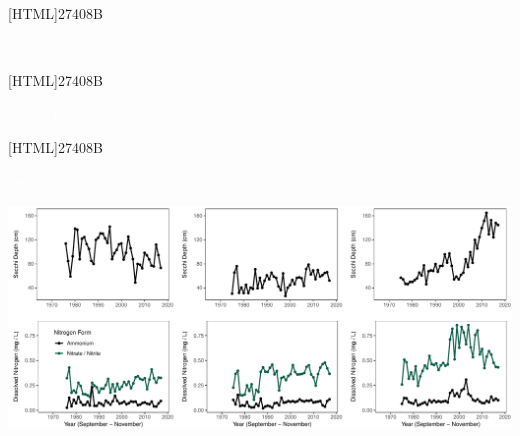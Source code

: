 \documentclass[]{article}\usepackage[]{graphicx}\usepackage[]{color}
\makeatletter
\def\maxwidth{ %
  \ifdim\Gin@nat@width>\linewidth
    \linewidth
  \else
    \Gin@nat@width
  \fi
}
\makeatother
\begin{document}
\vspace{-0cm}

\begin{Row}
   \begin{Cell}{1}
			\hspace{42pt}
			\begin{minipage}{195pt}
				[HTML]{27408B}{\parbox[c][12pt]{\textwidth}{
					\begin{center}
						{\LARGE \textcolor{white}{San Pablo Bay}}
					\end{center}
				}}
			\end{minipage}%
			\hspace{62pt}
			\begin{minipage}{195pt}
				[HTML]{27408B}{\parbox[c][12pt]{\textwidth}{
					\begin{center}
						{\LARGE \textcolor{white}{Suisun Bay}}
					\end{center}
				}}
			\end{minipage}%
			\hspace{62pt}
			\begin{minipage}{195pt}
				[HTML]{27408B}{\parbox[c][12pt]{\textwidth}{
					\begin{center}
						{\LARGE \textcolor{white}{Delta}}
					\end{center}
				}}
			\end{minipage}
   \end{Cell}
\end{Row}

\vspace{-0.2cm}

\begin{Row}
    \begin{Cell}{1}


{\centering \includegraphics[width=\maxwidth]{figures/water_quality_main_fig-1} 

}



		\end{Cell}
\end{Row}
\end{document}
